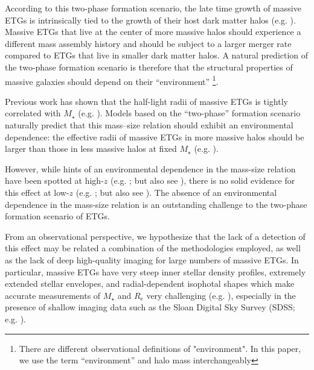 \documentclass[a4paper,fleqn,usenatbib]{mnras}
\def\mstar{{$M_{\star}$}}
\begin{document}
    According to this two-phase formation scenario, the late time growth of massive ETGs 
    is intrinsically tied to the growth of their host dark matter halos 
    (e.g. \citealt{Leauthaud2012, Behroozi2013, Shankar2013}). 
    Massive ETGs that live at the center of more massive halos should experience 
    a different mass assembly history and should be subject to a larger merger rate 
    compared to ETGs that live in smaller dark matter halos. 
    A natural prediction of the two-phase formation scenario is therefore that the 
    structural properties of massive galaxies should depend on their ``environment''
    \footnote{There are different observational definitions of "environment". 
    In this paper, we use the term ``environment'' and halo mass interchangeably}.
    
    Previous work has shown that the half-light radii of massive ETGs is tightly 
    correlated with \mstar{} (e.g. \citealt{Shen2003, Guo2009}). 
    Models based on the ``two-phase'' formation scenario naturally predict that this 
    mass--size relation should exhibit an environmental dependence: the effective radii 
    of massive ETGs in more massive halos should be larger than those in less massive
    halos at fixed \mstar{} (e.g. \citealt{Shankar2013, Shankar2014}).
    
    However, while hints of an environmental dependence in the mass-size relation have 
    been spotted at high-$z$ (e.g. \citealt{Papovich2012, Lani2013, Delaye2014}; but 
    also see \citealt{Rettura2010}), there is no solid evidence for this effect at 
    low-$z$ (e.g. \citealt{Nair2010, HCompany13}; but also see \citealt{Yoon2017}). 
    The absence of an environmental dependence in the mass-size relation is an 
    outstanding challenge to the two-phase formation scenario of ETGs.
    
    From an observational perspective, we hypothesize that the lack of a detection of 
    this effect may be related a combination of the methodologies employed, as well as 
    the lack of deep high-quality imaging for large numbers of massive ETGs. 
    In particular, massive ETGs have very steep inner stellar density profiles, 
    extremely extended stellar envelopes, and radial-dependent isophotal shapes which 
    make accurate measurements of \mstar{} and $R_{\mathrm{e}}$ very challenging
    (e.g. \citealt{Bernardi2013, DSouza2014}), 
    especially in the presence of shallow imaging data such as the Sloan Digital Sky 
    Survey (SDSS; e.g. \citealt{SDSSDR7, SDSSDR12}). 
       
\end{document}
